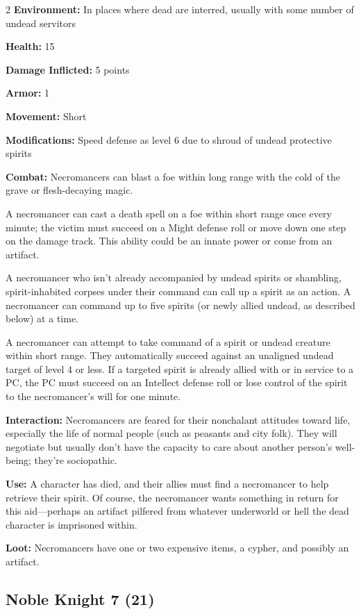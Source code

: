 \begin{multicols}{2}
\textbf{Environment:} In places where dead are interred, usually with some number of undead servitors 

\textbf{Health:} 15 

\textbf{Damage Inflicted:} 5 points 

\textbf{Armor:} 1 

\textbf{Movement:} Short 

\textbf{Modifications:} Speed defense as level 6 due to shroud of undead protective spirits 

\textbf{Combat:} Necromancers can blast a foe within long range with the cold of the grave or flesh-decaying magic. 

A necromancer can cast a death spell on a foe within short range once every minute; the victim must succeed on a Might defense roll or move down one step on the damage track. This ability could be an innate power or come from an artifact. 

A necromancer who isn’t already accompanied by undead spirits or shambling, spirit-inhabited corpses under their command can call up a spirit as an action. A necromancer can command up to five spirits (or newly allied undead, as described below) at a time. 

A necromancer can attempt to take command of a spirit or undead creature within short range. They automatically succeed against an unaligned undead target of level 4 or less. If a targeted spirit is already allied with or in service to a PC, the PC must succeed on an Intellect defense roll or lose control of the spirit to the necromancer’s will for one minute. 

\textbf{Interaction:} Necromancers are feared for their nonchalant attitudes toward life, especially the life of normal people (such as peasants and city folk). They will negotiate but usually don’t have the capacity to care about another person’s well-being; they’re sociopathic. 

\textbf{Use:} A character has died, and their allies must find a necromancer to help retrieve their spirit. Of course, the necromancer wants something in return for this aid—perhaps an artifact pilfered from whatever underworld or hell the dead character is imprisoned within. 

\textbf{Loot:} Necromancers have one or two expensive items, a cypher, and possibly an artifact.

\subsection{Noble Knight 7 (21)}


\end{multicols}
